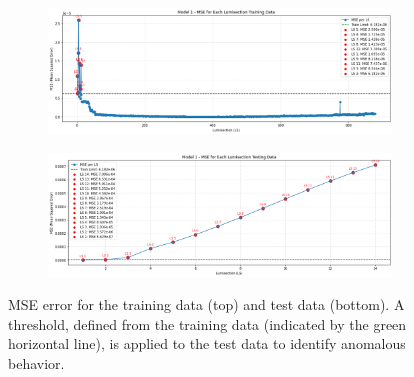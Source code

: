 \begin{figure}[H]
    \centering
    \begin{subfigure}[t]{1\textwidth}
        \centering
        \includegraphics[width=\textwidth]{images/MSE_train.png}
    \end{subfigure}
    \hfill
    \begin{subfigure}[t]{1\textwidth}
        \centering
        \includegraphics[width=\textwidth]{images/MSE_test.png}
    \end{subfigure}
    \caption{MSE error for the training data (top) and test data (bottom). A threshold, defined from the training data (indicated by the green horizontal line), is applied to the test data to identify anomalous behavior.}
    \label{fig:MSE}
\end{figure}
